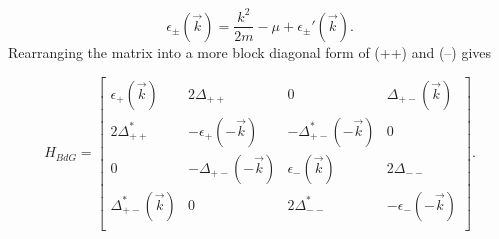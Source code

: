 \begin{equation}
  \epsilon_{\pm}(\vec{k}) = \dfrac{k^2}{2m} - \mu + \epsilon_{\pm}'(\vec{k}).
\end{equation}
Rearranging the matrix into a more block diagonal form of (++) and (--) gives

\begin{equation}
  H_{BdG} =
  \begin{bmatrix}
    \epsilon_+(\vec{k}) & 2\Delta_{++} & 0 & \Delta_{+-}(\vec{k}) \\
    2\Delta_{++}^* & -\epsilon_+(-\vec{k}) & -\Delta_{+-}^*(-\vec{k}) & 0 \\
    0 & -\Delta_{+-}(-\vec{k}) & \epsilon_-(\vec{k}) & 2\Delta_{--} \\
    \Delta_{+-}^*(\vec{k}) & 0 & 2\Delta_{--}^* & -\epsilon_-(-\vec{k}) \\
  \end{bmatrix}.
\end{equation}
%
%
